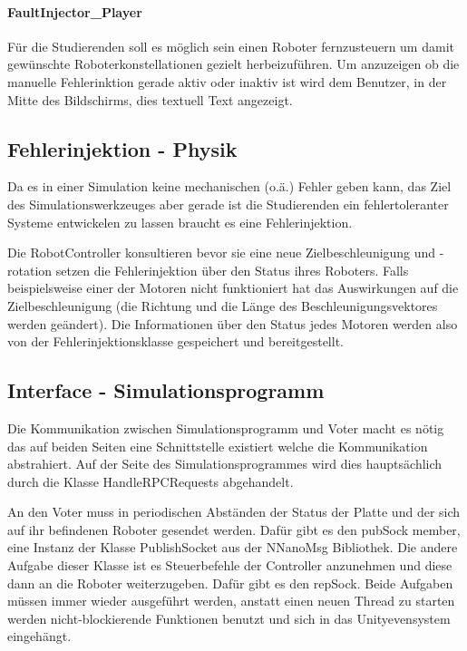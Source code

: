 \paragraph{FaultInjector\_Player} F{\"{u}}r die Studierenden soll es m{\"{o}}glich sein einen Roboter fernzusteuern um damit
gew{\"{u}}nschte Roboterkonstellationen gezielt herbeizuf{\"{u}}hren. Um anzuzeigen ob die manuelle Fehlerinktion gerade aktiv
oder inaktiv ist wird dem Benutzer, in der Mitte des Bildschirms, dies textuell Text angezeigt.

\subsection{Fehlerinjektion - Physik}
Da es in einer Simulation keine mechanischen (o.{\"{a}}.) Fehler geben kann, das Ziel des Simulationswerkzeuges aber gerade ist
die Studierenden ein fehlertoleranter Systeme entwickelen zu lassen braucht es eine Fehlerinjektion.

Die RobotController konsultieren bevor sie eine neue Zielbeschleunigung und -rotation setzen die Fehlerinjektion {\"{u}}ber den
Status ihres Roboters. Falls beispielsweise einer der Motoren nicht funktioniert hat das Auswirkungen auf die Zielbeschleunigung
(die Richtung und die L{\"{a}}nge des Beschleunigungsvektores werden ge{\"{a}}ndert). Die Informationen {\"{u}}ber den Status
jedes Motoren werden also von der Fehlerinjektionsklasse gespeichert und bereitgestellt.

\subsection{Interface - Simulationsprogramm}
Die Kommunikation zwischen Simulationsprogramm und Voter macht es n{\"{o}}tig das auf beiden Seiten eine Schnittstelle existiert
welche die Kommunikation abstrahiert. Auf der Seite des Simulationsprogrammes wird dies haupts{\"{a}}chlich durch die Klasse
HandleRPCRequests abgehandelt.

An den Voter muss in periodischen Abst{\"{a}}nden der Status der Platte und der sich auf ihr befindenen Roboter gesendet werden.
Daf{\"{u}}r gibt es den pubSock member, eine Instanz der Klasse PublishSocket aus der NNanoMsg Bibliothek. Die andere Aufgabe
dieser Klasse ist es Steuerbefehle der Controller anzunehmen und diese dann an die Roboter weiterzugeben. Daf{\"{u}}r gibt es
den repSock. Beide Aufgaben m{\"{u}}ssen immer wieder ausgef{\"{u}}hrt werden, anstatt einen neuen Thread zu starten werden
nicht-blockierende Funktionen benutzt und sich in das Unityevensystem eingeh{\"{a}}ngt.

